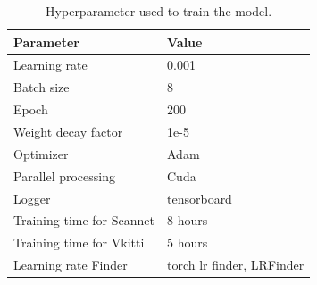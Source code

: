 	\begin{table}[h]
		\begin{center}
			\begin{tabular}{ | l | p{4cm} |}
				\hline
				
				\cellcolor{purple!30}Parameter & \cellcolor{purple!30}Value \\ \hline
				Learning rate & 0.001  \\ \hline
				Batch size & 8 \\ \hline
				Epoch & 200 \\ \hline
				Weight decay factor & 1e-5
				\\ \hline
				Optimizer & Adam  \\ \hline
				Parallel processing & Cuda  \\ \hline
				Logger & tensorboard  \\ \hline
				Training time for Scannet & 8 hours  \\ \hline
				Training time for Vkitti & 5 hours  \\ \hline
				Learning rate Finder & torch lr finder, LRFinder   \\ \hline
				\hline
			\end{tabular}
			\caption{Hyperparameter used to train the model.}
			\label{table:hype}
		\end{center}
	\end{table}
    

